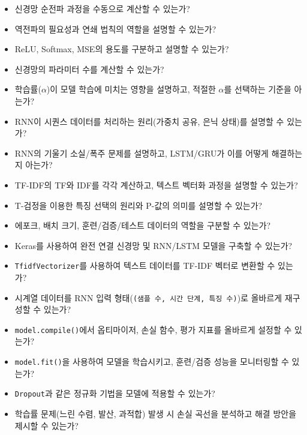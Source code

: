 \documentclass[11pt,a4paper]{book}
\theoremstyle{definition}
\begin{document}
\begin{tcolorbox}[title={\textbf{학습 및 이해도 점검}}]
\begin{itemize}
    \item 신경망 순전파 과정을 수동으로 계산할 수 있는가?
    \item 역전파의 필요성과 연쇄 법칙의 역할을 설명할 수 있는가?
    \item ReLU, Softmax, MSE의 용도를 구분하고 설명할 수 있는가?
    \item 신경망의 파라미터 수를 계산할 수 있는가?
    \item 학습률($\alpha$)이 모델 학습에 미치는 영향을 설명하고, 적절한 $\alpha$를 선택하는 기준을 아는가?
    \item RNN이 시퀀스 데이터를 처리하는 원리(가중치 공유, 은닉 상태)를 설명할 수 있는가?
    \item RNN의 기울기 소실/폭주 문제를 설명하고, LSTM/GRU가 이를 어떻게 해결하는지 아는가?
    \item TF-IDF의 TF와 IDF를 각각 계산하고, 텍스트 벡터화 과정을 설명할 수 있는가?
    \item T-검정을 이용한 특징 선택의 원리와 P-값의 의미를 설명할 수 있는가?
    \item 에포크, 배치 크기, 훈련/검증/테스트 데이터의 역할을 구분할 수 있는가?
\end{itemize}
\end{tcolorbox}

\begin{tcolorbox}[title={\textbf{실습 및 코드 구현 점검}}]
\begin{itemize}
    \item Keras를 사용하여 완전 연결 신경망 및 RNN/LSTM 모델을 구축할 수 있는가?
    \item \texttt{TfidfVectorizer}를 사용하여 텍스트 데이터를 TF-IDF 벡터로 변환할 수 있는가?
    \item 시계열 데이터를 RNN 입력 형태(\texttt{(샘플 수, 시간 단계, 특징 수)})로 올바르게 재구성할 수 있는가?
    \item \texttt{model.compile()}에서 옵티마이저, 손실 함수, 평가 지표를 올바르게 설정할 수 있는가?
    \item \texttt{model.fit()}을 사용하여 모델을 학습시키고, 훈련/검증 성능을 모니터링할 수 있는가?
    \item \texttt{Dropout}과 같은 정규화 기법을 모델에 적용할 수 있는가?
    \item 학습률 문제(느린 수렴, 발산, 과적합) 발생 시 손실 곡선을 분석하고 해결 방안을 제시할 수 있는가?
\end{itemize}
\end{tcolorbox}
\end{document}
